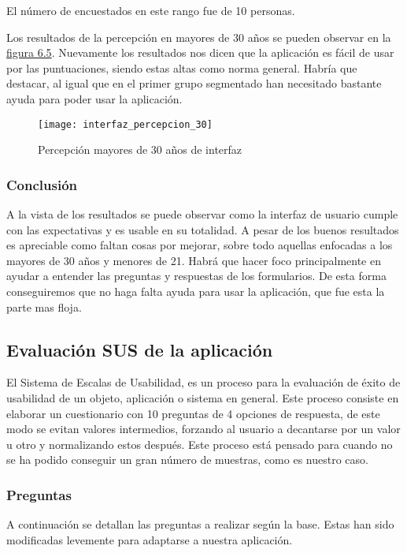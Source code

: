 El número de encuestados en este rango fue de 10 personas.

Los resultados de la percepción en mayores de 30 años se pueden observar en la \hyperref[fig:Percepción mayores de 30 años de interfaz]{figura 6.5}.
Nuevamente los resultados nos dicen que la aplicación es fácil de usar por las puntuaciones,
siendo estas altas como norma general. Habría que destacar, al igual que en el primer grupo segmentado
han necesitado bastante ayuda para poder usar la aplicación.

\begin{figure}[htb]
  \centering
  \texttt{[image: interfaz\_percepcion\_30]}
  \caption[Percepción mayores de 30 años de interfaz]{Percepción mayores de 30 años de interfaz}
  \label{fig:Percepción mayores de 30 años de interfaz}
\end{figure}

\subsubsection{Conclusión}
A la vista de los resultados se puede observar como la interfaz de usuario cumple
con las expectativas y es usable en su totalidad. A pesar de los buenos resultados
es apreciable como faltan cosas por mejorar, sobre todo aquellas enfocadas a los
mayores de 30 años y menores de 21. Habrá que hacer foco principalmente en
ayudar a entender las preguntas y respuestas de los formularios. De esta forma
conseguiremos que no haga falta ayuda para usar la aplicación, que fue esta
la parte mas floja.

\subsection{Evaluación SUS de la aplicación}
El Sistema de Escalas de Usabilidad, es un proceso para la evaluación de éxito
de usabilidad de un objeto, aplicación o sistema en general. Este proceso consiste
en elaborar un cuestionario con 10 preguntas de 4 opciones de respuesta, de este modo
se evitan valores intermedios, forzando al usuario a decantarse por un valor u otro y
normalizando estos después. Este proceso está pensado para cuando no se ha podido
conseguir un gran número de muestras, como es nuestro caso.

\subsubsection{Preguntas}
A continuación se detallan las preguntas a realizar según la base. Estas han sido modificadas
levemente para adaptarse a nuestra aplicación.

